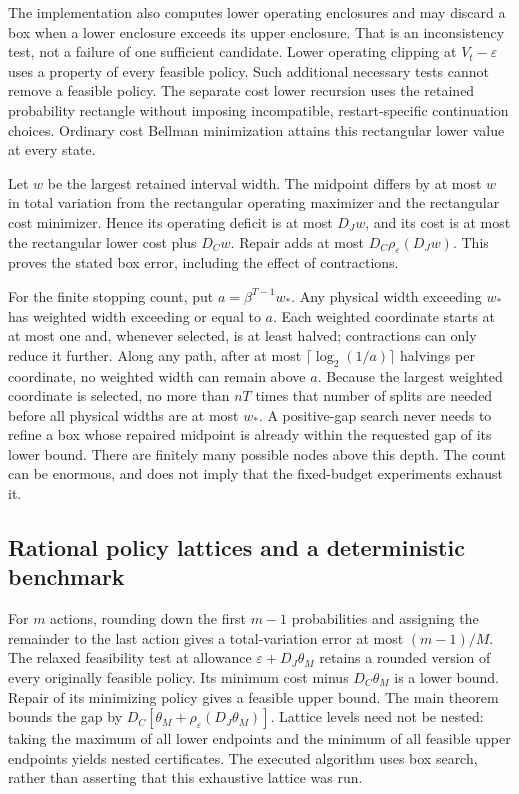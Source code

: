 The implementation also computes lower operating enclosures and may discard a box when a lower enclosure exceeds its upper enclosure. That is an inconsistency test, not a failure of one sufficient candidate. Lower operating clipping at $V_t-\varepsilon$ uses a property of every feasible policy. Such additional necessary tests cannot remove a feasible policy. The separate cost lower recursion uses the retained probability rectangle without imposing incompatible, restart-specific continuation choices. Ordinary cost Bellman minimization attains this rectangular lower value at every state.

Let $w$ be the largest retained interval width. The midpoint differs by at most $w$ in total variation from the rectangular operating maximizer and the rectangular cost minimizer. Hence its operating deficit is at most $D_Jw$, and its cost is at most the rectangular lower cost plus $D_Cw$. Repair adds at most $D_C\rho_\varepsilon(D_Jw)$. This proves the stated box error, including the effect of contractions.

For the finite stopping count, put $a=\beta^{T-1}w_*$. Any physical width exceeding $w_*$ has weighted width exceeding or equal to $a$. Each weighted coordinate starts at at most one and, whenever selected, is at least halved; contractions can only reduce it further. Along any path, after at most $\lceil\log_2(1/a)\rceil$ halvings per coordinate, no weighted width can remain above $a$. Because the largest weighted coordinate is selected, no more than $nT$ times that number of splits are needed before all physical widths are at most $w_*$. A positive-gap search never needs to refine a box whose repaired midpoint is already within the requested gap of its lower bound. There are finitely many possible nodes above this depth. The count can be enormous, and does not imply that the fixed-budget experiments exhaust it.

\subsection{Rational policy lattices and a deterministic benchmark}
For $m$ actions, rounding down the first $m-1$ probabilities and assigning the remainder to the last action gives a total-variation error at most $(m-1)/M$. The relaxed feasibility test at allowance $\varepsilon+D_J\theta_M$ retains a rounded version of every originally feasible policy. Its minimum cost minus $D_C\theta_M$ is a lower bound. Repair of its minimizing policy gives a feasible upper bound. The main theorem bounds the gap by $D_C[\theta_M+\rho_\varepsilon(D_J\theta_M)]$. Lattice levels need not be nested: taking the maximum of all lower endpoints and the minimum of all feasible upper endpoints yields nested certificates. The executed algorithm uses box search, rather than asserting that this exhaustive lattice was run.

